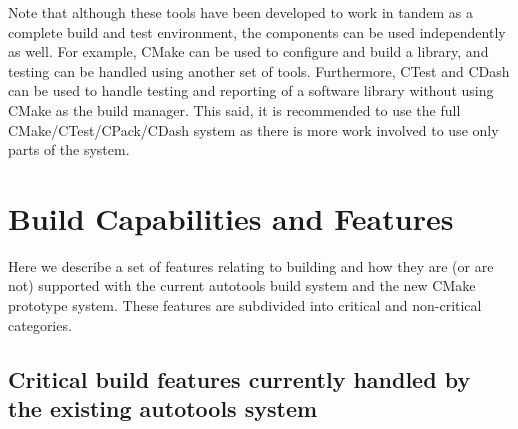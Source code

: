 \documentclass[pdf,ps2pdf,11pt]{SANDreport}
\begin{document}
Note that although these tools have been developed to work in tandem
as a complete build and test environment, the components can be used
independently as well. For example, CMake can be used to configure and
build a library, and testing can be handled using another set of
tools. Furthermore, CTest and CDash can be used to handle testing and
reporting of a software library without using CMake as the build
manager. This said, it is recommended to use the full
CMake/CTest/CPack/CDash system as there is more work involved to use
only parts of the system.

%
\section{Build Capabilities and Features}
%

Here we describe a set of features relating to building and how they
are (or are not) supported with the current autotools build system and
the new CMake prototype system.  These features are subdivided into
critical and non-critical categories.


%
{}\subsection{Critical build features currently handled by the
existing autotools system}
%
\end{document}
